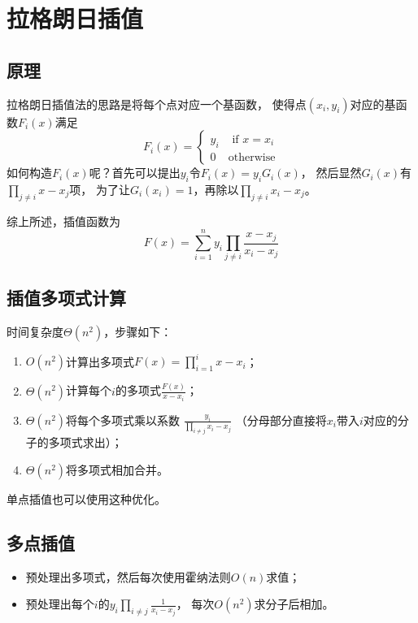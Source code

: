 \section{拉格朗日插值}
\subsection{原理}
拉格朗日插值法的思路是将每个点对应一个基函数，
使得点$(x_i,y_i)$对应的基函数$F_i(x)$满足
\begin{displaymath}
F_i(x)=\left\{\begin{array}{ll}
    y_i& \textrm{~if~$x=x_i$}\\
    0&\textrm{otherwise}
\end{array}\right.
\end{displaymath}
如何构造$F_i(x)$呢？首先可以提出$y_i$令$F_i(x)=y_iG_i(x)$，
然后显然$G_i(x)$有$\displaystyle \prod_{j\neq i}{x-x_j}$项，
为了让$G_i(x_i)=1$，再除以$\displaystyle \prod_{j\neq i}{x_i-x_j}$。

综上所述，插值函数为
\begin{displaymath}
    F(x)=\sum_{i=1}^n{y_i\prod_{j\neq i}{\frac{x-x_j}{x_i-x_j}}}
\end{displaymath}
\subsection{插值多项式计算}
时间复杂度$\Theta(n^2)$，步骤如下：
\begin{enumerate}
    \item $O(n^2)$计算出多项式$\displaystyle F(x)=\prod_{i=1}^i{x-x_i}$；
    \item $\Theta(n^2)$计算每个$i$的多项式$\frac{F(x)}{x-x_i}$；
    \item $\Theta(n^2)$将每个多项式乘以系数
    $\frac{y_i}{\displaystyle \prod_{i\neq j}{x_i-x_j}}$
    （分母部分直接将$x_i$带入$i$对应的分子的多项式求出）；
    \item $\Theta(n^2)$将多项式相加合并。
\end{enumerate}
单点插值也可以使用这种优化。
\subsection{多点插值}
\begin{itemize}
    \item 预处理出多项式，然后每次使用霍纳法则$O(n)$求值；
    \item 预处理出每个$i$的$\displaystyle y_i \prod_{i\neq j}\frac{1}{x_i-x_j}$，
    每次$O(n^2)$求分子后相加。
\end{itemize}
